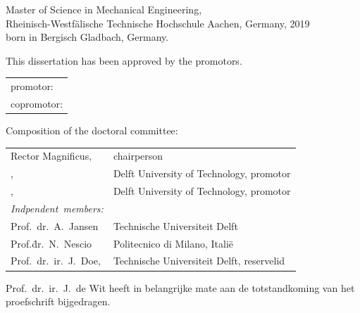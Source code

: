 \begin{titlepage}
\begin{center}
\bigskip
\bigskip

Master of Science in Mechanical Engineering, \\
Rheinisch-Westfälische Technische Hochschule Aachen,
Germany, 2019 \\
born in Bergisch Gladbach, Germany.

\vspace*{2\bigskipamount}

\end{center}

\clearpage
\thispagestyle{empty}

\noindent This dissertation has been approved by the
promotors.

\medskip\noindent
\begin{tabular}{l}
    promotor: \promotor{} \\
    copromotor: \copromotor{}
\end{tabular}

\bigskip
\noindent Composition of the doctoral committee:

\medskip\noindent
\begin{tabular}{p{4cm}l}
    Rector Magnificus, & chairperson\\
    \promotor{}, & Delft University of Technology, promotor \\
    \copromotor{}, & Delft University of Technology, promotor \\

    \medskip
    \mbox{\emph{Indpendent members:}} & \\

    Prof.\ dr.\ A.\ Jansen & Technische Universiteit Delft \\
    Prof.\.dr.\ N.\ Nescio & Politecnico di Milano, Itali\"e \\
    Prof.\ dr.\ ir.\ J.\ Doe, & Technische Universiteit Delft, reservelid \\

\end{tabular}

\medskip
\noindent Prof.\ dr.\ ir.\ J.\ de Wit heeft in belangrijke mate aan de totstandkoming van het proefschrift bijgedragen.


\end{titlepage}
